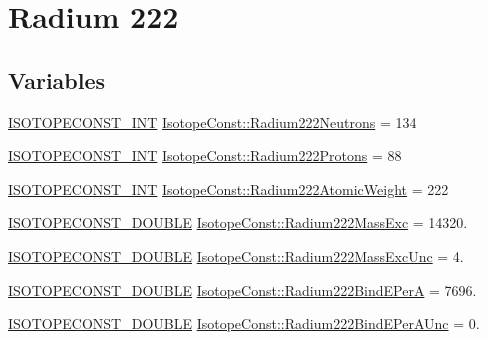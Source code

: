 \hypertarget{group___isotope_const-_radium-_ra222}{}\section{Radium 222}
\label{group___isotope_const-_radium-_ra222}
\subsection*{Variables}
\begin{DoxyCompactItemize}
\item 
\mbox{\hyperlink{group___isotope_const-_macros_ga5f18360b3e99483a35c32d789e62621c}{I\+S\+O\+T\+O\+P\+E\+C\+O\+N\+S\+T\+\_\+\+I\+NT}} \mbox{\hyperlink{group___isotope_const-_radium-_ra222_ga073c84343a5f5b4921411da1e3dbc49a}{Isotope\+Const\+::\+Radium222\+Neutrons}} = 134
\item 
\mbox{\hyperlink{group___isotope_const-_macros_ga5f18360b3e99483a35c32d789e62621c}{I\+S\+O\+T\+O\+P\+E\+C\+O\+N\+S\+T\+\_\+\+I\+NT}} \mbox{\hyperlink{group___isotope_const-_radium-_ra222_ga30b0beb69bd7db16e162d1dbd8cf0d03}{Isotope\+Const\+::\+Radium222\+Protons}} = 88
\item 
\mbox{\hyperlink{group___isotope_const-_macros_ga5f18360b3e99483a35c32d789e62621c}{I\+S\+O\+T\+O\+P\+E\+C\+O\+N\+S\+T\+\_\+\+I\+NT}} \mbox{\hyperlink{group___isotope_const-_radium-_ra222_ga100f69cb3d0a5e2e8f62061eef459a34}{Isotope\+Const\+::\+Radium222\+Atomic\+Weight}} = 222
\item 
\mbox{\hyperlink{group___isotope_const-_macros_ga8f45a7272ce02c0b4c65c44636ed719a}{I\+S\+O\+T\+O\+P\+E\+C\+O\+N\+S\+T\+\_\+\+D\+O\+U\+B\+LE}} \mbox{\hyperlink{group___isotope_const-_radium-_ra222_gaf08303303548d963de0975579acd7e3d}{Isotope\+Const\+::\+Radium222\+Mass\+Exc}} = 14320.
\item 
\mbox{\hyperlink{group___isotope_const-_macros_ga8f45a7272ce02c0b4c65c44636ed719a}{I\+S\+O\+T\+O\+P\+E\+C\+O\+N\+S\+T\+\_\+\+D\+O\+U\+B\+LE}} \mbox{\hyperlink{group___isotope_const-_radium-_ra222_ga555ddb6ab76c8da15a08699204352893}{Isotope\+Const\+::\+Radium222\+Mass\+Exc\+Unc}} = 4.
\item 
\mbox{\hyperlink{group___isotope_const-_macros_ga8f45a7272ce02c0b4c65c44636ed719a}{I\+S\+O\+T\+O\+P\+E\+C\+O\+N\+S\+T\+\_\+\+D\+O\+U\+B\+LE}} \mbox{\hyperlink{group___isotope_const-_radium-_ra222_ga3c980a431be606e657dbc438cf0c9e09}{Isotope\+Const\+::\+Radium222\+Bind\+E\+PerA}} = 7696.
\item 
\mbox{\hyperlink{group___isotope_const-_macros_ga8f45a7272ce02c0b4c65c44636ed719a}{I\+S\+O\+T\+O\+P\+E\+C\+O\+N\+S\+T\+\_\+\+D\+O\+U\+B\+LE}} \mbox{\hyperlink{group___isotope_const-_radium-_ra222_ga266761185b38a80d3ffe4d9d298d2351}{Isotope\+Const\+::\+Radium222\+Bind\+E\+Per\+A\+Unc}} = 0.

\end{DoxyCompactItemize}
